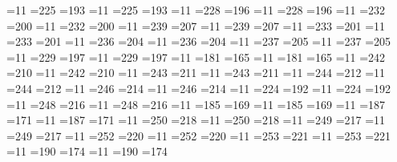 %


=11 =225 =193 %
=11 =225 =193 %
=11 =228 =196 %
=11 =228 =196 %
=11 =232 =200 %
=11 =232 =200 %
=11 =239 =207 %
=11 =239 =207 %
=11 =233 =201 %
=11 =233 =201 %
=11 =236 =204 %
=11 =236 =204 %
=11 =237 =205 %
=11 =237 =205 %
=11 =229 =197 %
=11 =229 =197 %
=11 =181 =165 %
=11 =181 =165 %
=11 =242 =210 %
=11 =242 =210 %
=11 =243 =211 %
=11 =243 =211 %
=11 =244 =212 %
=11 =244 =212 %
=11 =246 =214 %
=11 =246 =214 %
=11 =224 =192 %
=11 =224 =192 %
=11 =248 =216 %
=11 =248 =216 %
=11 =185 =169 %
=11 =185 =169 %
=11 =187 =171 %
=11 =187 =171 %
=11 =250 =218 %
=11 =250 =218 %
=11 =249 =217 %
=11 =249 =217 %
=11 =252 =220 %
=11 =252 =220 %
=11 =253 =221 %
=11 =253 =221 %
=11 =190 =174 %
=11 =190 =174 %

